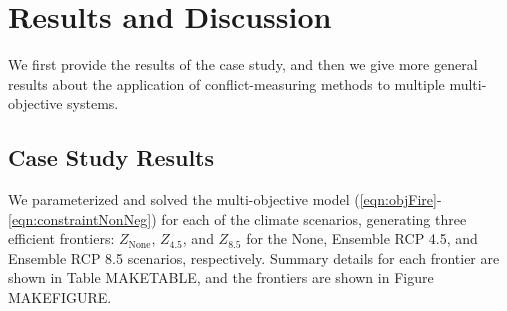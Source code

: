 \section{Results and Discussion}
\label{sec:results}
We first provide the results of the case study, and then we give more general results about the application of conflict-measuring methods to multiple multi-objective systems.

\subsection{Case Study Results}
We parameterized and solved the multi-objective model (\eqref{eqn:objFire}-\eqref{eqn:constraintNonNeg}) for each of the climate scenarios, generating three efficient frontiers: $Z_{\text{None}}$, $Z_{4.5}$, and $Z_{8.5}$ for the None, Ensemble RCP 4.5, and Ensemble RCP 8.5 scenarios, respectively. Summary details for each frontier are shown in Table MAKETABLE, and the frontiers are shown in Figure MAKEFIGURE.



